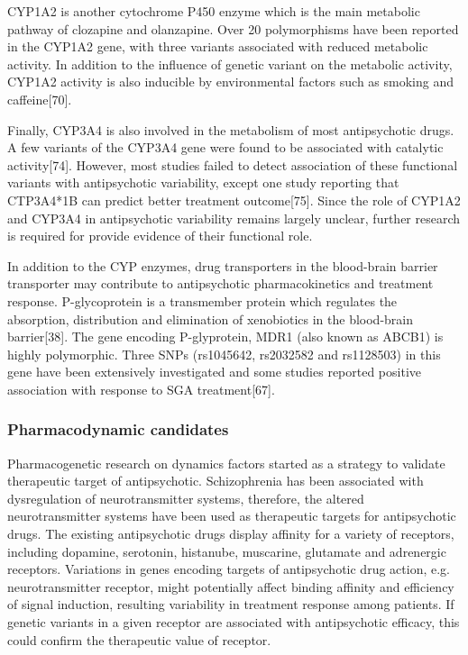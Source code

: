 \documentclass[12pt]{report}
\begin{document}
				CYP1A2 is another cytochrome P450 enzyme which is the main metabolic pathway of clozapine and olanzapine. 
				Over 20 polymorphisms have been reported in the CYP1A2 gene, with three variants associated with reduced metabolic activity. 
				In addition to the influence of genetic variant on the metabolic activity, CYP1A2 activity is also inducible by environmental factors such as smoking and caffeine[70].
				 
				Finally, CYP3A4 is also involved in the metabolism of most antipsychotic drugs. 
				A few variants of the CYP3A4 gene were found to be associated with catalytic activity[74]. 
				However, most studies failed to detect association of these functional variants with antipsychotic variability, except one study reporting that CTP3A4*1B can predict better treatment outcome[75]. 
				Since the role of CYP1A2 and CYP3A4 in antipsychotic variability remains largely unclear, further research is required for provide evidence of their functional role.
				
				In addition to the CYP enzymes, drug transporters in the blood-brain barrier transporter may contribute to antipsychotic pharmacokinetics and treatment response. 
				P-glycoprotein is a transmember protein which regulates the absorption, distribution and elimination of xenobiotics in the blood-brain barrier[38]. 
				The gene encoding P-glyprotein, MDR1 (also known as ABCB1) is highly polymorphic. 
				Three SNPs (rs1045642, rs2032582 and rs1128503) in this gene have been extensively investigated and some studies reported positive association with response to SGA treatment[67]. 
				
			\subsubsection{Pharmacodynamic candidates}
				 Pharmacogenetic research on dynamics factors started as a strategy to validate therapeutic target of antipsychotic. 
				 Schizophrenia has been associated with dysregulation of neurotransmitter systems, therefore, the altered neurotransmitter systems have been used as therapeutic targets for antipsychotic drugs. 
				 The existing antipsychotic drugs display affinity for a variety of receptors, including dopamine, serotonin, histanube, muscarine, glutamate and adrenergic receptors. 
				 Variations in genes encoding targets of antipsychotic drug action, e.g. neurotransmitter receptor, might potentially affect binding affinity and efficiency of signal induction, resulting variability in treatment response among patients. 
				 If genetic variants in a given receptor are associated with antipsychotic efficacy, this could confirm the therapeutic value of receptor.
\end{document}
